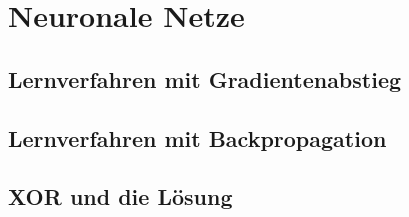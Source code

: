 \section{Neuronale Netze}

\subsection{Lernverfahren mit Gradientenabstieg}

\subsection{Lernverfahren mit Backpropagation}

\subsection{XOR und die Lösung}